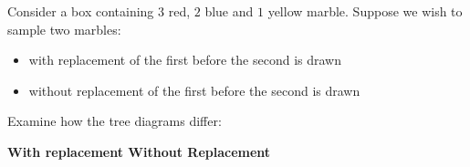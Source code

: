 \documentclass[11pt,a4paper]{book}
\begin{document}
Consider a box containing $3$ red, $2$ blue and $1$ yellow marble.
Suppose we wish to sample two marbles:

\begin{itemize}[leftmargin=4cm]

\item with replacement of the first before the second is drawn

\item without replacement of the first before the second is drawn

\end{itemize}

Examine how the tree diagrams differ:

\textbf{With replacement \hspace{5.2cm}Without Replacement}
\end{document}
